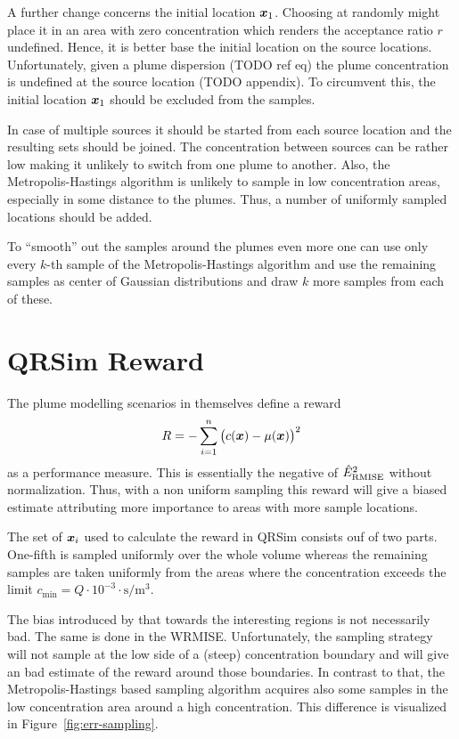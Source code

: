 A further change concerns the initial location $\bm{x}_1$. Choosing at randomly 
might place it in an area with zero concentration which renders the acceptance 
ratio $r$ undefined. Hence, it is better base the initial location on the source 
locations. Unfortunately, given a plume dispersion (TODO ref eq) the plume 
concentration is undefined at the source location (TODO appendix). To circumvent 
this, the initial location $\bm{x}_1$ should be excluded from the samples.

In case of multiple sources it should be started from each source location and 
the resulting sets should be joined. The concentration between sources can be 
rather low making it unlikely to switch from one plume to another. Also, the 
Metropolis-Hastings algorithm is unlikely to sample in low concentration areas, 
especially in some distance to the plumes. Thus, a number of uniformly sampled 
locations should be added.

To ``smooth'' out the samples around the plumes even more one can use only every 
$k$-th sample of the Metropolis-Hastings algorithm and use the remaining samples 
as center of Gaussian distributions and draw $k$ more samples from each of 
these.

\section{QRSim Reward}\label{sec:qrsim-reward}
The plume modelling scenarios in \textcite{denardi2013rn} themselves define 
a reward
\begin{equation}
    R = - \sum_{i = 1}^n \del{c(\vc x) - \mu(\vc x)}^2
\end{equation}
as a performance measure. This is essentially the negative of 
$\hat{E}_{\mathrm{RMISE}}^2$ without normalization. Thus, with a non uniform sampling 
this reward will give a biased estimate attributing more importance to areas 
with more sample locations.

The set of $\bm{x}_i$ used to calculate the reward in QRSim consists ouf of two 
parts. One-fifth is sampled uniformly over the whole volume whereas the 
remaining samples are taken uniformly from the areas where the concentration 
exceeds the limit $c_{\min} = Q \cdot 10^{-3} \cdot 
\si{\second\per\meter\cubed}$.

The bias introduced by that towards the interesting regions is not necessarily 
bad. The same is done in the WRMISE\@. Unfortunately, the sampling strategy will 
not sample at the low side of a (steep) concentration boundary and will give an 
bad estimate of the reward around those boundaries. In contrast to that, the 
Metropolis-Hastings based sampling algorithm acquires also some samples in the 
low concentration area around a high concentration.  This difference is 
visualized in Figure~\ref{fig:err-sampling}.

